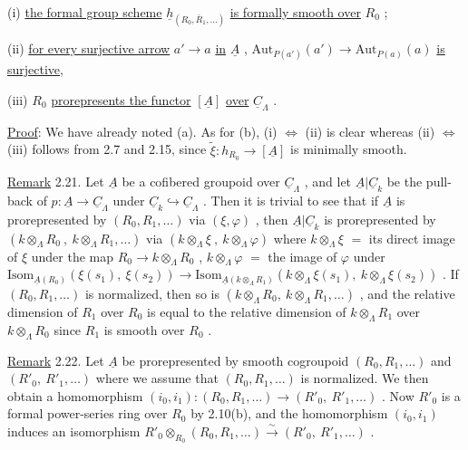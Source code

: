 (i)   \underline{the formal group scheme}  $\underline{h}_{(R_0,\bar{R}_1,\dots)}$  \underline{is formally smooth over}  $R_0$  ;

(ii)  \underline{for every surjective arrow}  $a' \to a$  \underline{in}  $\underline{A}$  ,
$\mathrm{Aut}_{P(a')}(a') \longrightarrow \mathrm{Aut}_{P(a)}(a)$  \underline{is surjective},

(iii)  $R_0$  \underline{prorepresents the functor}  $[\underline{A}]$  \underline{over}  $\underline{C}_\Lambda$  .



\underline{Proof}:  We have already noted (a). As for (b),  (i) $\Leftrightarrow$ (ii)  is clear whereas (ii) $\Leftrightarrow$ (iii)  follows from 2.7 and 2.15, since  $\tilde{\xi} : h_{R_0} \longrightarrow [\underline{A}]$  is minimally smooth.

\underline{Remark} 2.21.  Let  $\underline{A}$  be a cofibered groupoid over  $\underline{C}_\Lambda$  , and let  $\underline{A}|\underline{C}_k$  be the pull-back of  $p : \underline{A} \longrightarrow \underline{C}_\Lambda$  under  $\underline{C}_k \hookrightarrow \underline{C}_\Lambda$ . Then it is trivial to see that if  $\underline{A}$  is prorepresented by  $(R_0,R_1,\dots)$  via  $(\xi,\varphi)$  , then  $\underline{A}|\underline{C}_k$  is prorepresented by  $(k \otimes_\Lambda R_0\ ,\ k \otimes_\Lambda R_1,\dots)$  via  $(k \otimes_\Lambda \xi\ ,\ k \otimes_\Lambda \varphi)$  where  $k \otimes_\Lambda \xi$ $=$ its direct image of  $\xi$  under the map  $R_0 \longrightarrow k \otimes_\Lambda R_0$ ,  $k \otimes_\Lambda \varphi$ $=$ the image of  $\varphi$  under  $\mathrm{Isom}_{\underline{A}(R_0)}(\xi(s_1),\ \xi(s_2)) \longrightarrow \mathrm{Isom}_{\underline{A}(k \otimes_\Lambda R_1)}(k \otimes_\Lambda \xi(s_1),\ k \otimes_\Lambda \xi(s_2))$ . If  $(R_0,R_1,\dots)$  is normalized, then so is  $(k \otimes_\Lambda R_0,\ k \otimes_\Lambda R_1,\dots)$  , and the relative dimension of  $R_1$  over  $R_0$  is equal to the relative dimension of  $k \otimes_\Lambda R_1$  over  $k \otimes_\Lambda R_0$  since  $R_1$  is smooth over  $R_0$  .

\underline{Remark} 2.22.  Let  $\underline{A}$  be prorepresented by smooth cogroupoid  $(R_0,R_1,\dots)$  and  $(R'_0,\ R'_1,\dots)$  where we assume that  $(R_0,R_1,\dots)$  is normalized. We then obtain a homomorphism  $(i_0,i_1) : (R_0,R_1,\dots) \longrightarrow (R'_0,\ R'_1,\dots)$  . Now  $R'_0$  is a formal power-series ring over  $R_0$  by 2.10(b), and the homomorphism  $(i_0,i_1)$  induces an isomorphism  $R'_0 \otimes_{R_0} (R_0,R_1,\dots) \overset{\sim}{\longrightarrow} (R'_0,\ R'_1,\dots)$  .


